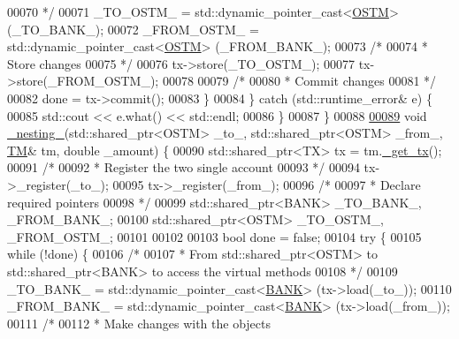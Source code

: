 \begin{DoxyCode}
00070 \textcolor{comment}{             */}
00071             \_TO\_OSTM\_ = std::dynamic\_pointer\_cast<\hyperlink{class_o_s_t_m}{OSTM}> (\_TO\_BANK\_);
00072             \_FROM\_OSTM\_ = std::dynamic\_pointer\_cast<\hyperlink{class_o_s_t_m}{OSTM}> (\_FROM\_BANK\_);
00073             \textcolor{comment}{/*}
00074 \textcolor{comment}{             * Store changes}
00075 \textcolor{comment}{             */}
00076             tx->store(\_TO\_OSTM\_);
00077             tx->store(\_FROM\_OSTM\_);
00078 
00079             \textcolor{comment}{/*}
00080 \textcolor{comment}{             * Commit changes}
00081 \textcolor{comment}{             */}
00082             done = tx->commit();
00083         \}
00084     \} \textcolor{keywordflow}{catch} (std::runtime\_error& e) \{
00085         std::cout << e.what() << std::endl;
00086     \}
00087 \}
00088 
\hypertarget{client_8h_source.tex_l00089}{}\hyperlink{classclient_ac0ebebd379895869c22f8919ad3bd37f_ac0ebebd379895869c22f8919ad3bd37f}{00089} \textcolor{keywordtype}{void} \hyperlink{classclient_ac0ebebd379895869c22f8919ad3bd37f_ac0ebebd379895869c22f8919ad3bd37f}{\_nesting\_}(std::shared\_ptr<OSTM> \_to\_, std::shared\_ptr<OSTM> \_from\_, 
      \hyperlink{class_t_m}{TM}& tm, \textcolor{keywordtype}{double} \_amount) \{
00090     std::shared\_ptr<TX> tx = tm.\hyperlink{class_t_m_a41cb0226cc4080c931651b13f74a0075_a41cb0226cc4080c931651b13f74a0075}{\_get\_tx}();
00091     \textcolor{comment}{/*}
00092 \textcolor{comment}{     * Register the two single account}
00093 \textcolor{comment}{     */}
00094     tx->\_register(\_to\_);
00095     tx->\_register(\_from\_);
00096     \textcolor{comment}{/*}
00097 \textcolor{comment}{     * Declare required pointers }
00098 \textcolor{comment}{     */}
00099     std::shared\_ptr<BANK> \_TO\_BANK\_, \_FROM\_BANK\_;
00100     std::shared\_ptr<OSTM> \_TO\_OSTM\_, \_FROM\_OSTM\_;
00101 
00102 
00103     \textcolor{keywordtype}{bool} done = \textcolor{keyword}{false};
00104     \textcolor{keywordflow}{try} \{
00105         \textcolor{keywordflow}{while} (!done) \{
00106             \textcolor{comment}{/*}
00107 \textcolor{comment}{             * From std::shared\_ptr<OSTM> to std::shared\_ptr<BANK> to access the virtual methods}
00108 \textcolor{comment}{             */}
00109             \_TO\_BANK\_ = std::dynamic\_pointer\_cast<\hyperlink{class_b_a_n_k}{BANK}> (tx->load(\_to\_));
00110             \_FROM\_BANK\_ = std::dynamic\_pointer\_cast<\hyperlink{class_b_a_n_k}{BANK}> (tx->load(\_from\_));
00111             \textcolor{comment}{/*}
00112 \textcolor{comment}{             * Make changes with the objects}

\end{DoxyCode}
